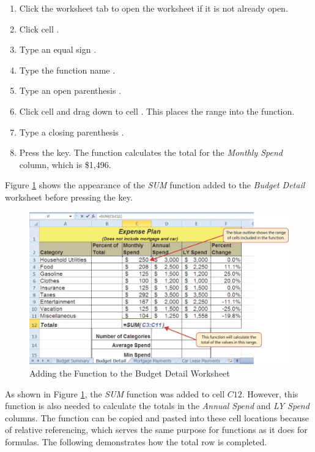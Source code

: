 \begin{enumbox}
	\begin{enumerate}
		\item Click the  worksheet tab to open the worksheet if it is not already open.
		\item Click cell .
		\item Type an equal sign \fmtTyping{=}.
		\item Type the function name .
		\item Type an open parenthesis \fmtTyping{(}.
		\item Click cell  and drag down to cell . This places the range  into the function.
		\item Type a closing parenthesis \fmtTyping{)}.
		\item Press the  key. The function calculates the total for the \textit{Monthly Spend} column, which is \$1,496.
	\end{enumerate}
\end{enumbox}

Figure \ref{02:fig11} shows the appearance of the \textit{SUM} function added to the \textit{Budget Detail} worksheet before pressing the  key.

\begin{figure}[H]
	\centering
	\includegraphics[width=\maxwidth{.95\linewidth}]{gfx/ch02_fig11}
	\caption{Adding the  Function to the Budget Detail Worksheet}
	\label{02:fig11}
\end{figure}

As shown in Figure \ref{02:fig11}, the \textit{SUM} function was added to cell $ C12 $. However, this function is also needed to calculate the totals in the \textit{Annual Spend} and \textit{LY Spend} columns. The function can be copied and pasted into these cell locations because of relative referencing, which serves the same purpose for functions as it does for formulas. The following demonstrates how the total row is completed.

